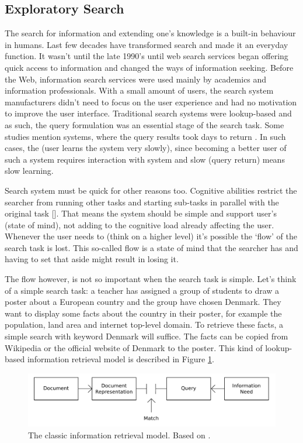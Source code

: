 \subsection{Exploratory Search}
The search for information and extending one's knowledge is a built-in behaviour in humans.
Last few decades have transformed search and made it an everyday function.
It wasn't until the late 1990's until web search services began offering quick access to information and changed the ways of information seeking.
Before the Web, information search services were used mainly by academics and information professionals.
With a small amount of users, the search system manufacturers didn't need to focus on the user experience and had no motivation to improve the user interface.
Traditional search systems were lookup-based and as such, the query formulation was an essential stage of the search task.
Some studies mention systems, where the query results took days to return . In such cases, the (user learns the system very slowly), since becoming a better user of such a system requires interaction with system and slow (query return) means slow learning.

Search system must be quick for other reasons too. Cognitive abilities restrict the searcher from running other tasks and starting sub-tasks in parallel with the original task []. That means the system should be simple and support user's (state of mind), not adding to the cognitive load already affecting the user. Whenever the user needs to (think on a higher level) it's possible the ‘flow' of the search task is lost. This so-called flow is a state of mind that the searcher has and having to set that aside might result in losing it.

The flow however, is not so important when the search task is simple. Let's think of a simple search task: a teacher has assigned a group of students to draw a poster about a European country and the group have chosen Denmark. They want to display some facts about the country in their poster, for example the population, land area and internet top-level domain. To retrieve these facts, a simple search with keyword Denmark will suffice.
The facts can be copied from Wikipedia or the official website of Denmark to the poster.
This kind of lookup-based information retrieval model is described in Figure \ref{figure_classicIR}.

\begin{figure}[htp] %
\caption{The classic information retrieval model. Based on \protect\cite{bates89}.}
\label{figure_classicIR}
\centering
\includegraphics[scale=0.45]{figures/classicIR.pdf}
\end{figure}

